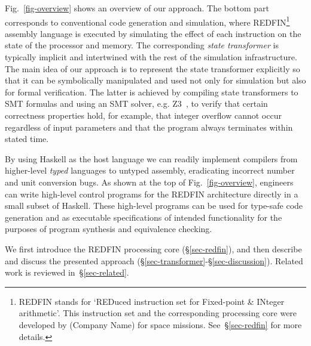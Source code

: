 Fig.~\ref{fig-overview} shows an overview of our approach. The bottom part
corresponds to conventional code generation and simulation, where
REDFIN\footnote{REDFIN stands for `REDuced instruction set for Fixed-point \&
INteger arithmetic'. This instruction set and the corresponding processing core
were developed by (Company Name) for space missions.
See~\S\ref{sec-redfin} for more details.} assembly language is executed by
simulating the effect of each instruction on the state of the processor and memory.
The corresponding \emph{state transformer} is typically implicit and intertwined
with the rest of the simulation infrastructure. The main idea of our approach is
to represent the state transformer explicitly so that it can be symbolically
manipulated and used not only for simulation but also for formal verification.
The latter is achieved by compiling state transformers to SMT formulas and using
an SMT solver, e.g. Z3~\cite{de2008z3}, to verify that certain correctness
properties hold, for example, that integer overflow cannot occur regardless of
input parameters and that the program always terminates within stated time.

By using Haskell as the host language we can readily implement compilers from
higher-level \emph{typed} languages to untyped assembly, eradicating incorrect
number and unit conversion bugs. As shown at the top of Fig.~\ref{fig-overview},
engineers can write high-level control programs for the REDFIN architecture
directly in a small subset of Haskell. These high-level programs can be used for
type-safe code generation and as executable specifications of intended
functionality for the purposes of program synthesis and equivalence checking.


We first introduce the REDFIN processing core (\S\ref{sec-redfin}), and then
describe and discuss the presented approach
(\S\ref{sec-transformer}-\S\ref{sec-discussion}). Related work is reviewed
in~\S\ref{sec-related}.
